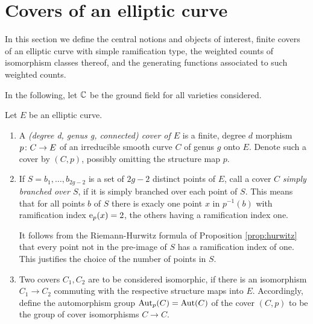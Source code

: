 \section{Covers of an elliptic curve} \label{sec:covers-definitions}

In this section we define the central notions and objects of interest, \ie finite covers of an elliptic curve with simple ramification type, the weighted counts of isomorphism classes thereof, and the generating functions associated to such weighted counts.

In the following, let $\mathbb{C}$ be the ground field for all varieties considered.

\begin{defi} Let $E$ be an elliptic curve. 
 \begin{enumerate}
  \item A \emph{(degree d, genus g, connected) cover of $E$} is a finite, degree $d$ morphism $p\colon C\to E$ of an irreducible smooth curve $C$ of genus $g$ onto $E$. Denote such a cover by $(C,p)$, possibly omitting the structure map $p$.

  \item If $S={b_1,\dotsc,b_{2g-2}}$ is a set of $2g-2$ distinct points of $E$, call a cover $C$ \emph{simply branched over $S$}, if it is simply branched over each point of $S$. This means that for all points $b$ of $S$ there is exacly one point $x$ in $p^{-1}(b)$ with ramification index $\operatorname{e}_p(x)=2$, the others having a ramification index one.
  
  It follows from the Riemann-Hurwitz formula of Proposition \ref{prop:hurwitz} that every point not in the pre-image of $S$ has a ramification index of one. This justifies the choice of the number of points in $S$.

  \item Two covers $C_1, C_2$ are to be considered isomorphic, if there is an isomorphism $C_1\to C_2$ commuting with the respective structure maps into $E$. Accordingly, define the automorphism group $\operatorname{Aut}_p(C)=\operatorname{Aut}(C)$ of the cover $(C,p)$ to be the group of cover isomorphisms $C\to C$. 
 \end{enumerate}
\end{defi}
\fi


